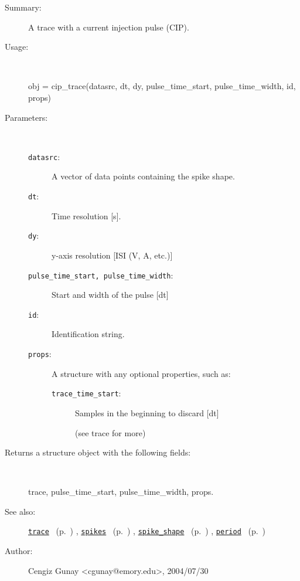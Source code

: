 \begin{description}
\item[Summary:]A trace with a current injection pulse (CIP).
%
\item[Usage:]~%
\begin{lyxcode}%
obj = cip\_trace(datasrc, dt, dy,
		  pulse\_time\_start, pulse\_time\_width, id, props)
%
\end{lyxcode}%
%
%
\item[Parameters:]~
\begin{description}%
\item[\texttt{datasrc}:]
 A vector of data points containing the spike shape.
\item[\texttt{dt}:]
 Time resolution [s].
\item[\texttt{dy}:]
 y-axis resolution [ISI (V, A, etc.)]
\item[\texttt{pulse\_time\_start, pulse\_time\_width}:]


Start and width of the pulse [dt]\item[\texttt{id}:]
 Identification string.
\item[\texttt{props}:]
 A structure with any optional properties, such as:
\begin{description}%
\item[\texttt{trace\_time\_start}:]
 Samples in the beginning to discard [dt]

(see trace for more)\end{description}%
\end{description}%
%
\item[Returns a structure object with the following fields:]~

	trace, pulse\_time\_start, pulse\_time\_width, props.
%
%
\item[See also:]%
\hyperlink{ref_trace}{\texttt{trace}}%
\ (p.~\pageref{ref_trace})%
%
, \hyperlink{ref_spikes}{\texttt{spikes}}%
\ (p.~\pageref{ref_spikes})%
%
, \hyperlink{ref_spike_shape}{\texttt{spike\_shape}}%
\ (p.~\pageref{ref_spike_shape})%
%
, \hyperlink{ref_period}{\texttt{period}}%
\ (p.~\pageref{ref_period})%
%
%
\item[Author:]%
Cengiz Gunay <cgunay@emory.edu>, 2004/07/30%
\end{description}
\methodline%
